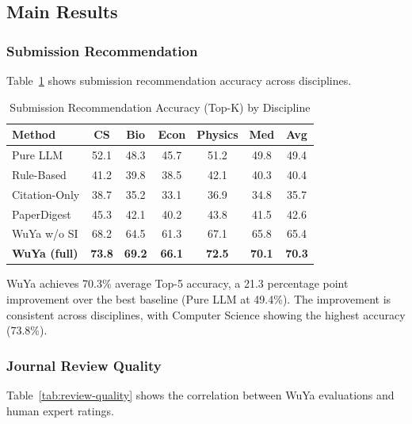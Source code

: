 \subsection{Main Results}

\subsubsection{Submission Recommendation}

Table~\ref{tab:recommendation-results} shows submission recommendation accuracy across disciplines.

\begin{table}[t]
\centering
\caption{Submission Recommendation Accuracy (Top-K) by Discipline}
\label{tab:recommendation-results}
\begin{tabular}{@{}lcccccc@{}}
\toprule
\textbf{Method} & \textbf{CS} & \textbf{Bio} & \textbf{Econ} & \textbf{Physics} & \textbf{Med} & \textbf{Avg} \\
\midrule
Pure LLM & 52.1 & 48.3 & 45.7 & 51.2 & 49.8 & 49.4 \\
Rule-Based & 41.2 & 39.8 & 38.5 & 42.1 & 40.3 & 40.4 \\
Citation-Only & 38.7 & 35.2 & 33.1 & 36.9 & 34.8 & 35.7 \\
PaperDigest & 45.3 & 42.1 & 40.2 & 43.8 & 41.5 & 42.6 \\
WuYa w/o SI & 68.2 & 64.5 & 61.3 & 67.1 & 65.8 & 65.4 \\
\textbf{WuYa (full)} & \textbf{73.8} & \textbf{69.2} & \textbf{66.1} & \textbf{72.5} & \textbf{70.1} & \textbf{70.3} \\
\bottomrule
\end{tabular}
\end{table}

WuYa achieves 70.3\% average Top-5 accuracy, a 21.3 percentage point improvement over the best baseline (Pure LLM at 49.4\%). The improvement is consistent across disciplines, with Computer Science showing the highest accuracy (73.8\%).

\subsubsection{Journal Review Quality}

Table~\ref{tab:review-quality} shows the correlation between WuYa evaluations and human expert ratings.


